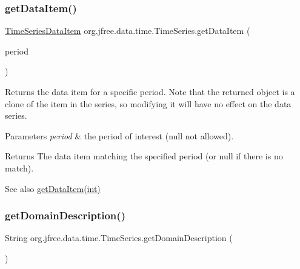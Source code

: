 \subsubsection{\texorpdfstring{get\+Data\+Item()}{getDataItem()}\hspace{0.1cm}{\footnotesize\ttfamily [2/2]}}
{\footnotesize\ttfamily \mbox{\hyperlink{classorg_1_1jfree_1_1data_1_1time_1_1_time_series_data_item}{Time\+Series\+Data\+Item}} org.\+jfree.\+data.\+time.\+Time\+Series.\+get\+Data\+Item (\begin{DoxyParamCaption}\item[{\mbox{\hyperlink{classorg_1_1jfree_1_1data_1_1time_1_1_regular_time_period}{Regular\+Time\+Period}}}]{period }\end{DoxyParamCaption})}

Returns the data item for a specific period. Note that the returned object is a clone of the item in the series, so modifying it will have no effect on the data series.


\begin{DoxyParams}{Parameters}
{\em period} & the period of interest ({\ttfamily null} not allowed).\\
\hline
\end{DoxyParams}
\begin{DoxyReturn}{Returns}
The data item matching the specified period (or {\ttfamily null} if there is no match).
\end{DoxyReturn}
\begin{DoxySeeAlso}{See also}
\mbox{\hyperlink{classorg_1_1jfree_1_1data_1_1time_1_1_time_series_a9025d2287a71b6e86fdfb9eb68c07042}{get\+Data\+Item(int)}} 
\end{DoxySeeAlso}
\mbox{\label{classorg_1_1jfree_1_1data_1_1time_1_1_time_series_a08680700093b691679af7f6fe5eddd0d}} 
\subsubsection{\texorpdfstring{get\+Domain\+Description()}{getDomainDescription()}}
{\footnotesize\ttfamily String org.\+jfree.\+data.\+time.\+Time\+Series.\+get\+Domain\+Description (\begin{DoxyParamCaption}{ }\end{DoxyParamCaption})}

